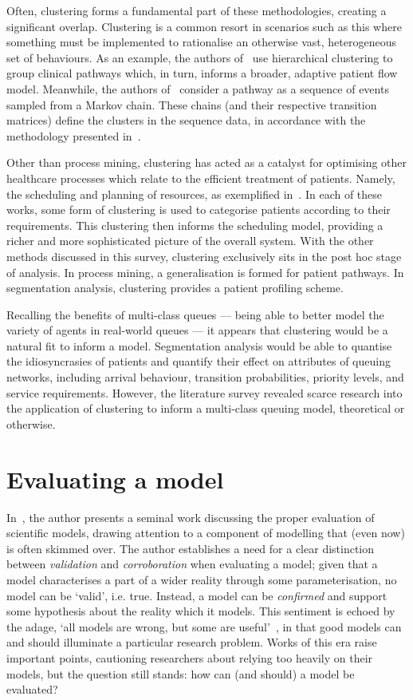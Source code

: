Often, clustering forms a fundamental part of these methodologies, creating a
significant overlap. Clustering is a common resort in scenarios such as
this where something must be implemented to rationalise an otherwise vast,
heterogeneous set of behaviours. As an example, the authors
of~\cite{Prokofyeva2020} use hierarchical clustering to group clinical pathways
which, in turn, informs a broader, adaptive patient flow model. Meanwhile, the
authors of~\cite{Rebuge2012} consider a pathway as a sequence of events sampled
from a Markov chain. These chains (and their respective transition matrices)
define the clusters in the sequence data, in accordance with the methodology
presented in~\cite{Cadez2000}.

Other than process mining, clustering has acted as a catalyst for optimising
other healthcare processes which relate to the efficient treatment of patients.
Namely, the scheduling and planning of resources, as exemplified
in~\cite{Nasir2018,Steins2013,Yousefi2020}. In each of these works, some form of
clustering is used to categorise patients according to their requirements. This
clustering then informs the scheduling model, providing a richer and more
sophisticated picture of the overall system. With the other methods discussed in
this survey, clustering exclusively sits in the post hoc stage of analysis. In
process mining, a generalisation is formed for patient pathways. In segmentation
analysis, clustering provides a patient profiling scheme.

Recalling the benefits of multi-class queues --- being able to better model the
variety of agents in real-world queues --- it appears that clustering would be a
natural fit to inform a model. Segmentation analysis would be able to quantise
the idiosyncrasies of patients and quantify their effect on attributes of
queuing networks, including arrival behaviour, transition probabilities,
priority levels, and service requirements. However, the literature survey
revealed scarce research into the application of clustering to inform a
multi-class queuing model, theoretical or otherwise.


\section{Evaluating a model}

In~\cite{Caswell1976}, the author presents a seminal work discussing the proper
evaluation of scientific models, drawing attention to a component of modelling
that (even now) is often skimmed over. The author establishes a need for a clear
distinction between \emph{validation} and \emph{corroboration} when evaluating a
model; given that a model characterises a part of a wider reality through some
parameterisation, no model can be `valid', i.e. true. Instead, a model can be
\emph{confirmed} and support some hypothesis about the reality which it models.
This sentiment is echoed by the adage, `all models are wrong, but some are
useful'~\cite{Box1979}, in that good models can and should illuminate a
particular research problem. Works of this era raise important points,
cautioning researchers about relying too heavily on their models, but the
question still stands: how can (and should) a model be evaluated?

